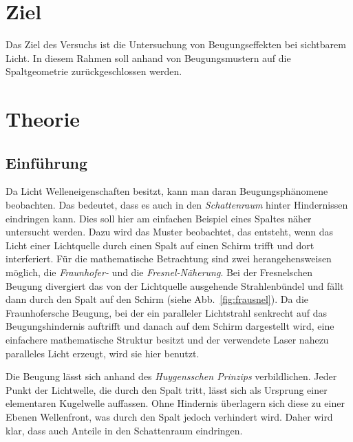 \section{Ziel}
\label{sec:Ziel}
Das Ziel des Versuchs ist die Untersuchung von Beugungseffekten bei sichtbarem Licht. In diesem Rahmen soll anhand von Beugungsmustern auf die Spaltgeometrie zurückgeschlossen werden.

\section{Theorie}
\label{sec:theorie}

\subsection{Einführung}
Da Licht Welleneigenschaften besitzt, kann man daran Beugungsphänomene beobachten. Das bedeutet, dass es auch in den \emph{Schattenraum} hinter Hindernissen eindringen kann. Dies soll hier am einfachen Beispiel eines Spaltes näher untersucht werden. Dazu wird das Muster beobachtet, das entsteht, wenn das Licht einer Lichtquelle durch einen Spalt auf einen Schirm trifft und dort interferiert. Für die mathematische Betrachtung sind zwei herangehensweisen möglich, die \emph{Fraunhofer-} und die \emph{Fresnel-Näherung}. Bei der Fresnelschen Beugung divergiert das von der Lichtquelle ausgehende Strahlenbündel und fällt dann durch den Spalt auf den Schirm (siehe Abb.~\ref{fig:frausnel}). Da die Fraunhofersche Beugung, bei der ein paralleler Lichtstrahl senkrecht auf das Beugungshindernis auftrifft und danach auf dem Schirm dargestellt wird, eine einfachere mathematische Struktur besitzt und der verwendete Laser nahezu paralleles Licht erzeugt, wird sie hier benutzt.


Die Beugung lässt sich anhand des \emph{Huygensschen Prinzips} verbildlichen. Jeder Punkt der Lichtwelle, die durch den Spalt tritt, lässt sich als Ursprung einer elementaren Kugelwelle auffassen. Ohne Hindernis überlagern sich diese zu einer Ebenen Wellenfront, was durch den Spalt jedoch verhindert wird. Daher wird klar, dass auch Anteile in den Schattenraum eindringen.

